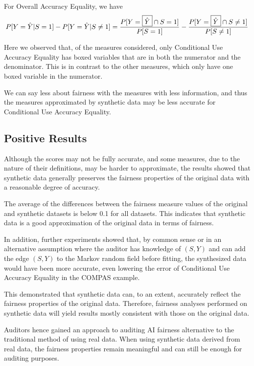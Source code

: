 \documentclass[manuscript,screen,review,anonymous]{acmart}
\begin{document}
For Overall Accuracy Equality, we have
\[
P[Y = \hat{Y} | {S} = 1 ] - P[Y = \hat{Y} | {S} \neq 1]
= \frac{P[{Y} = \boxed{\hat{Y}} \cap {S} = 1]}{P[{S} = 1]} - \frac{P[{Y} = \boxed{\hat{Y}} \cap {{S}} \neq 1]}{P[{{S}} \neq 1]}
\]

Here we observed that, of the measures considered, only Conditional Use Accuracy Equality has boxed variables that are in both the numerator and the denominator. This is in contrast to the other measures, which only have one boxed variable in the numerator.

We can say less about fairness with the measures with less information, and thus the measures approximated by synthetic data may be less accurate for Conditional Use Accuracy Equality.

\subsection{Positive Results}

Although the scores may not be fully accurate, and some measures, due to the nature of their definitions, may be harder to approximate, the results showed that synthetic data generally preserves the fairness properties of the original data with a reasonable degree of accuracy.

The average of the differences between the fairness measure values of the original and synthetic datasets is below 0.1 for all datasets. This indicates that synthetic data is a good approximation of the original data in terms of fairness.

In addition, further experiments showed that, by common sense or in an alternative assumption where the auditor has knowledge of $(S,Y)$ and can add the edge $(S,Y)$ to the Markov random field before fitting, the synthesized data would have been more accurate, even lowering the error of Conditional Use Accuracy Equality in the COMPAS example.

This demonstrated that synthetic data can, to an extent, accurately reflect the fairness properties of the original data. Therefore, fairness analyses performed on synthetic data will yield results mostly consistent with those on the original data.

Auditors hence gained an approach to auditing AI fairness alternative to the traditional method of using real data. When using synthetic data derived from real data, the fairness properties remain meaningful and can still be enough for auditing purposes.
\end{document}
